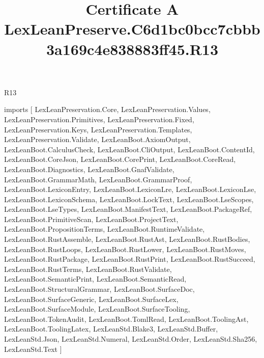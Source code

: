 \begin{lexlean}{R13}
\title{Certificate A LexLeanPreserve.C6d1bc0bcc7cbbb3a169c4e838883ff45.R13}
\begin{coremodule}
imports [
  LexLeanPreservation.Core,
  LexLeanPreservation.Values,
  LexLeanPreservation.Primitives,
  LexLeanPreservation.Fixed,
  LexLeanPreservation.Keys,
  LexLeanPreservation.Templates,
  LexLeanPreservation.Validate,
  LexLeanBoot.AxiomOutput,
  LexLeanBoot.CalculusCheck,
  LexLeanBoot.CliOutput,
  LexLeanBoot.ContentId,
  LexLeanBoot.CoreJson,
  LexLeanBoot.CorePrint,
  LexLeanBoot.CoreRead,
  LexLeanBoot.Diagnostics,
  LexLeanBoot.GnafValidate,
  LexLeanBoot.GrammarMath,
  LexLeanBoot.GrammarProof,
  LexLeanBoot.LexiconEntry,
  LexLeanBoot.LexiconLre,
  LexLeanBoot.LexiconLse,
  LexLeanBoot.LexiconSchema,
  LexLeanBoot.LockText,
  LexLeanBoot.LseScopes,
  LexLeanBoot.LseTypes,
  LexLeanBoot.ManifestText,
  LexLeanBoot.PackageRef,
  LexLeanBoot.PrimitiveScan,
  LexLeanBoot.ProjectText,
  LexLeanBoot.PropositionTerms,
  LexLeanBoot.RuntimeValidate,
  LexLeanBoot.RustAssemble,
  LexLeanBoot.RustAst,
  LexLeanBoot.RustBodies,
  LexLeanBoot.RustLoops,
  LexLeanBoot.RustLower,
  LexLeanBoot.RustMoves,
  LexLeanBoot.RustPackage,
  LexLeanBoot.RustPrint,
  LexLeanBoot.RustSucceed,
  LexLeanBoot.RustTerms,
  LexLeanBoot.RustValidate,
  LexLeanBoot.SemanticPrint,
  LexLeanBoot.SemanticRead,
  LexLeanBoot.StructuralGrammar,
  LexLeanBoot.SurfaceDoc,
  LexLeanBoot.SurfaceGeneric,
  LexLeanBoot.SurfaceLex,
  LexLeanBoot.SurfaceModule,
  LexLeanBoot.SurfaceTooling,
  LexLeanBoot.TokenAudit,
  LexLeanBoot.TomlRead,
  LexLeanBoot.ToolingAst,
  LexLeanBoot.ToolingLatex,
  LexLeanStd.Blake3,
  LexLeanStd.Buffer,
  LexLeanStd.Json,
  LexLeanStd.Numeral,
  LexLeanStd.Order,
  LexLeanStd.Sha256,
  LexLeanStd.Text
]


\end{coremodule}
\end{lexlean}
